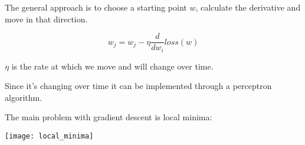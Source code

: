 The general approach is to choose a starting point $w$, calculate the derivative and move in that direction.

\[
w_j = w_j - \eta \frac{d}{dw_i}loss(w)
\]



$\eta$ is the rate at which we move and will change over time.

Since it's changing over time it can be implemented through a perceptron algorithm.

The main problem with gradient descent is local minima: 

\texttt{[image: local\_minima]}